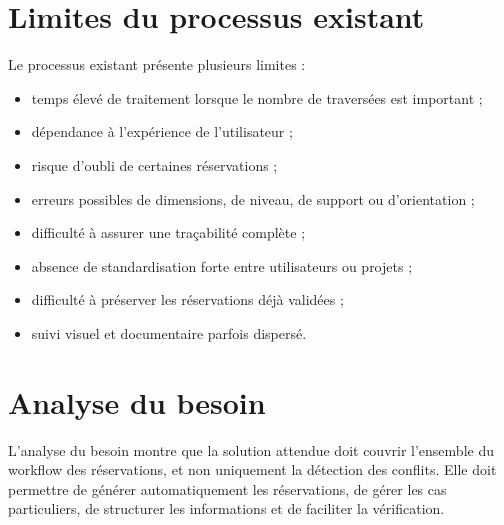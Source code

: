 \documentclass[12pt,a4paper]{report}
\begin{document}
\section{Limites du processus existant}
Le processus existant présente plusieurs limites :
\begin{itemize}[leftmargin=1.2cm]
    \item temps élevé de traitement lorsque le nombre de traversées est important ;
    \item dépendance à l'expérience de l'utilisateur ;
    \item risque d'oubli de certaines réservations ;
    \item erreurs possibles de dimensions, de niveau, de support ou d'orientation ;
    \item difficulté à assurer une traçabilité complète ;
    \item absence de standardisation forte entre utilisateurs ou projets ;
    \item difficulté à préserver les réservations déjà validées ;
    \item suivi visuel et documentaire parfois dispersé.
\end{itemize}

\section{Analyse du besoin}
L'analyse du besoin montre que la solution attendue doit couvrir l'ensemble du workflow des réservations, et non uniquement la détection des conflits. Elle doit permettre de générer automatiquement les réservations, de gérer les cas particuliers, de structurer les informations et de faciliter la vérification.
\end{document}
